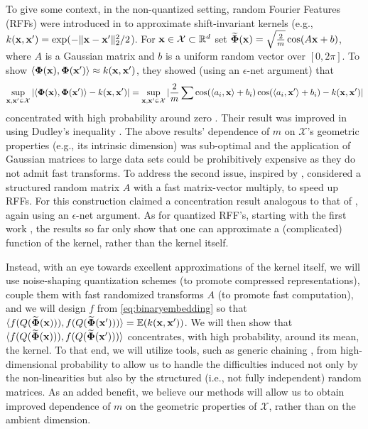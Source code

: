 To give some context, in the non-quantized setting, random Fourier Features (RFFs) were introduced in \cite{rahimi2008random} to approximate shift-invariant kernels (e.g., $k(\mathbf{x}, \mathbf{x}') = \exp(-\|\mathbf{x} - \mathbf{x}'\|_2^2/2$). For  $\mathbf{x}\in\mathcal{X}\subset \mathbb{R}^d$ \cite{rahimi2008random} set  $\widetilde{\mathbf{\Phi}}(\mathbf{x}) = \sqrt{\frac{2}{m}}\cos(A\mathbf{x} + b)$, where $A$ is a Gaussian matrix and $b$ is a uniform random vector over $[0, 2\pi]$. To show $\langle \mathbf{\Phi}(\mathbf{x}), \mathbf{\Phi}(\mathbf{x}')\rangle \approx k(\mathbf{x}, \mathbf{x}')$, they showed  (using an $\epsilon$-net argument) that  
$$\sup_{\mathbf{x}, \mathbf{x}'\in\mathcal{X}}|\langle \mathbf{\Phi}(\mathbf{x}), \mathbf{\Phi}(\mathbf{x}')\rangle - k(\mathbf{x}, \mathbf{x}')| = \sup_{\mathbf{x}, \mathbf{x}'\in\mathcal{X}}|\frac{2}{m}\sum \cos(\langle a_i, \mathbf{x}\rangle + b_i)\cos(\langle a_i, \mathbf{x}'\rangle + b_i) - k(\mathbf{x}, \mathbf{x}')|$$
concentrated with high probability around zero \cite{ledoux2001concentration}. Their result was improved in  \cite{sriperumbudur2015optimal} using Dudley's inequality \cite{ledoux2001concentration}. The above results' dependence of $m$ on $\mathcal{X}$'s geometric properties (e.g., its intrinsic dimension) was sub-optimal and the application of Gaussian matrices to large data sets could be prohibitively expensive as they do not admit fast transforms. To address the second issue, inspired by \cite{dasgupta2011fast},  \cite{le2013fastfood} considered a structured random matrix $A$ with a fast matrix-vector multiply, to speed up RFFs. %
For this construction \cite{le2014fastfood} claimed a concentration result analogous to that of \cite{rahimi2008random}, again using an $\epsilon$-net argument. As for quantized RFF's, starting with the first work  \cite{raginsky2009locality}, the results so far only show that one can approximate a (complicated) function of the kernel, rather than the kernel itself.

Instead, with an eye towards excellent approximations of the kernel itself, we will use noise-shaping quantization schemes (to promote compressed representations), couple them with fast randomized transforms $A$ (to promote fast computation), and we will design $f$ from \eqref{eq:binaryembedding} so that $\langle f(Q(\widetilde{\mathbf{\Phi}} (\mathbf{x}))), f(Q(\widetilde{\mathbf{\Phi}} (\mathbf{x}')))\rangle = \mathbb{E}( k(\mathbf{x},\mathbf{x}'))$. We will then show that $\langle f(Q(\widetilde{\mathbf{\Phi}} (\mathbf{x}))), f(Q(\widetilde{\mathbf{\Phi}} (\mathbf{x}')))\rangle$ concentrates, with high probability, around its mean, the kernel. To that end, we will utilize tools, such as generic chaining \cite{talagrand2006generic}, from high-dimensional probability \cite{vershynin2018high} to allow us to handle the difficulties induced not only by the non-linearities but also by the structured (i.e., not fully independent) random matrices. As an added benefit, we believe our methods will allow us to obtain improved dependence of $m$ on the geometric properties of $\mathcal{X}$, rather than on the ambient dimension.

